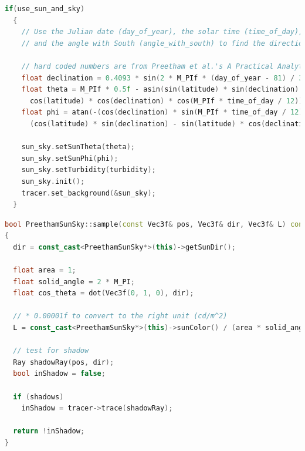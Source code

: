 \documentclass[a4paper]{article}
\begin{document}
\newpage
\begin{lstlisting}[language=C++,caption=RenderEngine::init\_tracer(),label=lst:renderengine::init_tracer]
if(use_sun_and_sky)
  {
    // Use the Julian date (day_of_year), the solar time (time_of_day), the latitude (latitude),
    // and the angle with South (angle_with_south) to find the direction toward the sun (sun_dir).

    // hard coded numbers are from Preetham et al.'s A Practical Analytical Model for Daylight, SIGGRAPH 1999
    float declination = 0.4093 * sin(2 * M_PIf * (day_of_year - 81) / 368);
    float theta = M_PIf * 0.5f - asin(sin(latitude) * sin(declination) - 
      cos(latitude) * cos(declination) * cos(M_PIf * time_of_day / 12));
    float phi = atan(-(cos(declination) * sin(M_PIf * time_of_day / 12)) / 
      (cos(latitude) * sin(declination) - sin(latitude) * cos(declination) * cos(M_PIf * time_of_day / 12)));

    sun_sky.setSunTheta(theta);
    sun_sky.setSunPhi(phi);
    sun_sky.setTurbidity(turbidity);
    sun_sky.init();
    tracer.set_background(&sun_sky);
  }
\end{lstlisting}

\begin{lstlisting}[language=C++,caption=PreethamSunSky::sample(..),label=lst:preethamsunsky::sample]
bool PreethamSunSky::sample(const Vec3f& pos, Vec3f& dir, Vec3f& L) const
{
  dir = const_cast<PreethamSunSky*>(this)->getSunDir();

  float area = 1;
  float solid_angle = 2 * M_PI;
  float cos_theta = dot(Vec3f(0, 1, 0), dir);

  // * 0.00001f to convert to the right unit (cd/m^2)
  L = const_cast<PreethamSunSky*>(this)->sunColor() / (area * solid_angle * cos_theta) * 0.00001f;

  // test for shadow
  Ray shadowRay(pos, dir);
  bool inShadow = false;

  if (shadows)
    inShadow = tracer->trace(shadowRay);

  return !inShadow;
}
\end{lstlisting}
\end{document}
